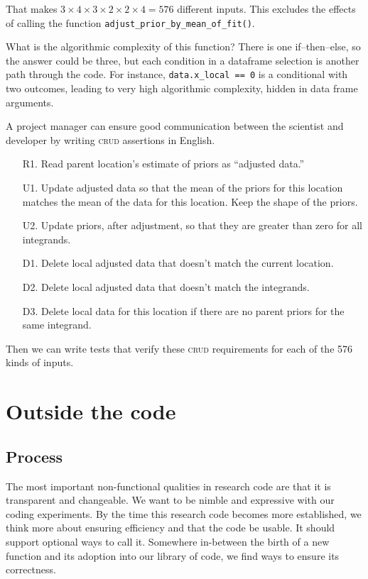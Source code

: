\documentclass[fleqn,10pt]{olplainarticle}
\begin{document}
\noindent{}That makes $3\times 4 \times 3\times 2\times 2\times 4=576$ different inputs.
This excludes the effects of calling the function
\lstinline!adjust_prior_by_mean_of_fit()!.

What is the algorithmic complexity of this function? There is one
if--then--else, so the answer could be three, but each condition in a dataframe
selection is another path through the code. For instance,
\lstinline!data.x_local == 0! is a conditional with two outcomes, leading
to very high algorithmic complexity, hidden in data frame arguments.

A project manager can ensure good communication between the scientist and
developer by writing \textsc{crud} assertions in English.
\begin{itemize}
    \item[R1.] Read parent location's estimate of priors as ``adjusted data.''
    \item[U1.] Update adjusted data so that the mean of the priors for this location matches
        the mean of the data for this location. Keep the shape of the priors.
    \item[U2.] Update priors, after adjustment, so that they are greater
        than zero for all integrands.
    \item[D1.] Delete local adjusted data that doesn't match the current location.
    \item[D2.] Delete local adjusted data that doesn't match the integrands.
    \item[D3.] Delete local data for this location if there are no parent
        priors for the same integrand.
\end{itemize}
Then we can write tests that verify these \textsc{crud} requirements for
each of the 576 kinds of inputs.





\section{Outside the code}\label{sec:outside-code}

\subsection{Process}

The most important non-functional qualities in research code are that it
is transparent and changeable. We want to be nimble and expressive
with our coding experiments. By the time this research code
becomes more established, we think more about ensuring efficiency
and that the code be usable. It should support optional ways to
call it. Somewhere in-between the birth of a new function and its
adoption into our library of code, we find ways to ensure its
correctness.
\end{document}
